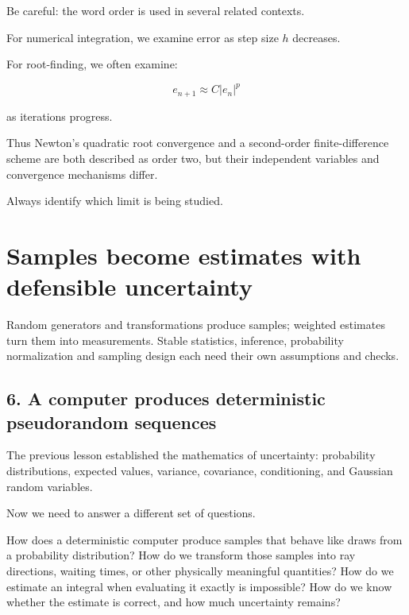 \hypertarget{02-foundations-ii-ch029-root-finding-convergence-order-versus-discretization-order}{}

Be careful: the word order is used in several related contexts.

For numerical integration, we examine error as step size \(h\) decreases.

For root-finding, we often examine:

\[ e_{n+1}\approx C|e_n|^p \]

as iterations progress.

Thus Newton's quadratic root convergence and a second-order finite-difference scheme are both described as order two, but their independent variables and convergence mechanisms differ.

Always identify which limit is being studied.

\section{Samples become estimates with defensible uncertainty}\label{02-foundations-ii-ch029-samples-become-estimates-with-defensible-uncertainty}

\hypertarget{02-foundations-ii-ch029-samples-become-estimates-with-defensible-uncertainty}{}

Random generators and transformations produce samples; weighted estimates turn them into measurements. Stable statistics, inference, probability normalization and sampling design each need their own assumptions and checks.

\subsection{6. A computer produces deterministic pseudorandom sequences}\label{02-foundations-ii-ch029-a-computer-produces-deterministic-pseudorandom-sequences}

\hypertarget{02-foundations-ii-ch029-a-computer-produces-deterministic-pseudorandom-sequences}{}

The previous lesson established the mathematics of uncertainty: probability distributions, expected values, variance, covariance, conditioning, and Gaussian random variables.

Now we need to answer a different set of questions.

How does a deterministic computer produce samples that behave like draws from a probability distribution? How do we transform those samples into ray directions, waiting times, or other physically meaningful quantities? How do we estimate an integral when evaluating it exactly is impossible? How do we know whether the estimate is correct, and how much uncertainty remains?


